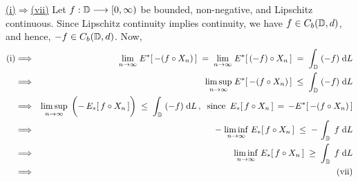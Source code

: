 \clearpage
\noindent
\underline{(i)\;$\Longrightarrow$\;(vii)}
\vskip 0.2cm \noindent
Let $f : \mathbb{D} \longrightarrow [0,\infty)$ be bounded, non-negative, and Lipschitz continuous.
Since Lipschitz continuity implies continuity, we have $f \in C_{b}(\mathbb{D},d)$, and hence, $-f \in C_{b}(\mathbb{D},d)$.
Now,
\begin{eqnarray*}
\textnormal{(i)}
&\Longrightarrow&
	{\color{white}1}\underset{n\rightarrow\infty}{\lim}\;E^{*}\!\left[\,-(f \circ X_{n})\,\right]
	\;=\; \underset{n\rightarrow\infty}{\lim}\;E^{*}\!\left[\,(-f) \circ X_{n}\,\right]
	\;=\; \int_{\D}\;(-f)\;\d L
\\
&\Longrightarrow&
	\underset{n\rightarrow\infty}{\limsup}\;E^{*}\!\left[\,-(f \circ X_{n})\,\right] \;\leq\; \int_{\D}\;(-f)\;\d L
\\
&\Longrightarrow&
	\underset{n\rightarrow\infty}{\limsup}\;
	\left(\overset{{\color{white}\vert}}{-}\,E_{*}\!\left[\,f \circ X_{n}\,\right]\right) \;\leq\; \int_{\D}\;(-f)\;\d L\,,
	\;\;\textnormal{since \,$E_{*}[\,f \circ X_{n}\,] \,=\, -E^{*}[\,-(f \circ X_{n})\,]$}
\\
&\Longrightarrow&
	-\;\underset{n\rightarrow\infty}{\liminf}\;E_{*}\!\left[\,f \circ X_{n}\,\right]
	\;\leq\; -\,\int_{\D}\;f\;\d L
\\
&\Longrightarrow&
	\underset{n\rightarrow\infty}{\liminf}\;E_{*}\!\left[\,f \circ X_{n}\,\right]
	\;\geq\; \int_{\D}\;f\;\d L
\\
&\Longrightarrow&
	\textnormal{(vii)}
\end{eqnarray*}

